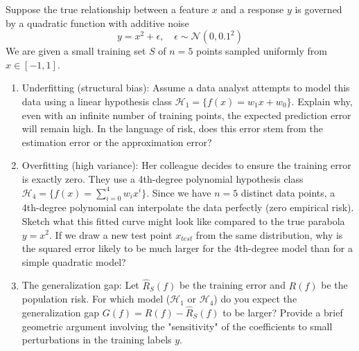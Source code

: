 \begin{myexercise}
Suppose the true relationship between a feature $x$ and a response $y$ is governed by a quadratic function with additive noise
$$y = x^2 + \epsilon, \quad \epsilon \sim \mathcal{N}(0, 0.1^2)$$
We are given a small training set $S$ of $n=5$ points sampled uniformly from $x \in [-1, 1]$.
\begin{enumerate}
\item  Underfitting (structural bias):
Assume a data analyst attempts to model this data using a linear hypothesis class $\mathcal{H}_1 = \{f(x) = w_1x + w_0\}$.
Explain why, even with an infinite number of training points, the expected prediction error will remain high.
In the language of risk, does this error stem from the estimation error or the approximation error?
\item Overfitting (high variance):
Her colleague decides to ensure the training error is exactly zero. They use a 4th-degree polynomial hypothesis class $\mathcal{H}_4 = \{f(x) = \sum_{i=0}^4 w_ix^i\}$.
Since we have $n=5$ distinct data points, a 4th-degree polynomial can interpolate the data perfectly (zero empirical risk). Sketch what this fitted curve might look like compared to the true parabola $y = x^2$.
If we draw a new test point $x_{test}$ from the same distribution, why is the squared error likely to be much larger for the 4th-degree model than for a simple quadratic model?
\item The generalization gap:
Let $\hat{R}_S(f)$ be the training error and $R(f)$ be the population risk.
For which model ($\mathcal{H}_1$ or $\mathcal{H}_4$) do you expect the generalization gap $G(f) = R(f) - \hat{R}_S(f)$ to be larger?
Provide a brief geometric argument involving the "sensitivity" of the coefficients to small perturbations in the training labels $y$.
\end{enumerate}   
\end{myexercise}

